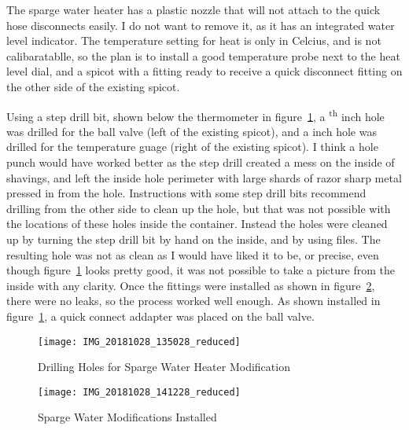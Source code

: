 
\FloatBarrier{}

The sparge water heater has a plastic nozzle that will not attach to the quick hose disconnects easily.  I do not want to remove it, as it has an integrated water level indicator.  The temperature setting for heat is only in Celcius, and is not calibaratablle, so the plan is to install a good temperature probe next to the heat level dial, and a spicot with a fitting ready to receive a quick disconnect fitting on the other side of the existing spicot.

Using a step drill bit, shown below the thermometer in figure~\ref{fig:swm:drilled}, a \textsuperscript{th} inch hole was drilled for the ball valve (left of the existing spicot), and a  inch hole was drilled for the temperature guage (right of the existing spicot).  I think a hole punch would have worked better as the step drill created a mess on the inside of shavings, and left the inside hole perimeter with large shards of razor sharp metal pressed in from the hole.  Instructions with some step drill bits recommend drilling from the other side to clean up the hole, but that was not possible with the locations of these holes inside the container.  Instead the holes were cleaned up by turning the step drill bit by hand on the inside, and by using files.  The resulting hole was not as clean as I would have liked it to be, or precise, even though figure~\ref{fig:swm:drilled} looks pretty good, it was not possible to take a picture from the inside with any clarity.  Once the fittings were installed as shown in figure~\ref{fig:swm:installed}, there were no leaks, so the process worked well enough.  As shown installed in figure~\ref{fig:swm:drilled}, a quick connect addapter was placed on the ball valve.

\begin{figure}[H]
  \centering
  \texttt{[image: IMG\_20181028\_135028\_reduced]}
  \caption{Drilling Holes for Sparge Water Heater Modification}\label{fig:swm:drilled}
\end{figure}

\FloatBarrier{}

\begin{figure}[H]
  \centering
  \texttt{[image: IMG\_20181028\_141228\_reduced]}
  \caption{Sparge Water Modifications Installed}\label{fig:swm:installed}
\end{figure}

